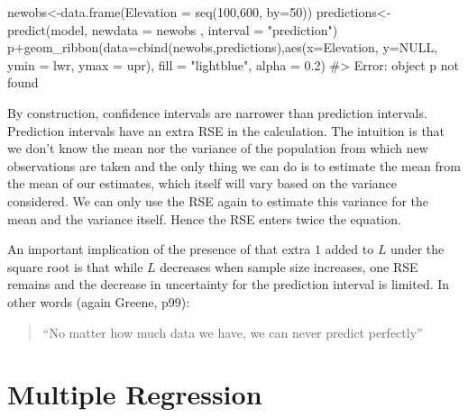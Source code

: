 \documentclass[
  letterpaper,
  DIV=11,
  numbers=noendperiod]{scrreprt}
\newenvironment{Shaded}{\begin{snugshade}}{\end{snugshade}}
\newcommand{\AttributeTok}[1]{\textcolor[rgb]{0.40,0.45,0.13}{#1}}
\newcommand{\CommentTok}[1]{\textcolor[rgb]{0.37,0.37,0.37}{#1}}
\newcommand{\ConstantTok}[1]{\textcolor[rgb]{0.56,0.35,0.01}{#1}}
\newcommand{\DecValTok}[1]{\textcolor[rgb]{0.68,0.00,0.00}{#1}}
\newcommand{\FloatTok}[1]{\textcolor[rgb]{0.68,0.00,0.00}{#1}}
\newcommand{\FunctionTok}[1]{\textcolor[rgb]{0.28,0.35,0.67}{#1}}
\newcommand{\NormalTok}[1]{\textcolor[rgb]{0.00,0.23,0.31}{#1}}
\newcommand{\OtherTok}[1]{\textcolor[rgb]{0.00,0.23,0.31}{#1}}
\newcommand{\SpecialCharTok}[1]{\textcolor[rgb]{0.37,0.37,0.37}{#1}}
\newcommand{\StringTok}[1]{\textcolor[rgb]{0.13,0.47,0.30}{#1}}
\begin{document}
\begin{Shaded}
\begin{Highlighting}[]
\NormalTok{newobs}\OtherTok{\textless{}{-}}\FunctionTok{data.frame}\NormalTok{(}\AttributeTok{Elevation =} \FunctionTok{seq}\NormalTok{(}\DecValTok{100}\NormalTok{,}\DecValTok{600}\NormalTok{, }\AttributeTok{by=}\DecValTok{50}\NormalTok{))}
\NormalTok{predictions}\OtherTok{\textless{}{-}}\FunctionTok{predict}\NormalTok{(model, }\AttributeTok{newdata =}\NormalTok{ newobs , }\AttributeTok{interval =} \StringTok{"prediction"}\NormalTok{)}
\NormalTok{p}\SpecialCharTok{+}\FunctionTok{geom\_ribbon}\NormalTok{(}\AttributeTok{data=}\FunctionTok{cbind}\NormalTok{(newobs,predictions),}\FunctionTok{aes}\NormalTok{(}\AttributeTok{x=}\NormalTok{Elevation, }\AttributeTok{y=}\ConstantTok{NULL}\NormalTok{, }\AttributeTok{ymin =}\NormalTok{ lwr, }\AttributeTok{ymax =}\NormalTok{ upr), }\AttributeTok{fill =} \StringTok{"lightblue"}\NormalTok{, }\AttributeTok{alpha =} \FloatTok{0.2}\NormalTok{)}
\CommentTok{\#\textgreater{} Error: object \textquotesingle{}p\textquotesingle{} not found}
\end{Highlighting}
\end{Shaded}

By construction, confidence intervals are narrower than prediction
intervals. Prediction intervals have an extra RSE in the calculation.
The intuition is that we don't know the mean nor the variance of the
population from which new observations are taken and the only thing we
can do is to estimate the mean from the mean of our estimates, which
itself will vary based on the variance considered. We can only use the
RSE again to estimate this variance for the mean and the variance
itself. Hence the RSE enters twice the equation.

An important implication of the presence of that extra \(1\) added to
\(L\) under the square root is that while \(L\) decreases when sample
size increases, one RSE remains and the decrease in uncertainty for the
prediction interval is limited. In other words (again Greene, p99):

\begin{quote}
``No matter how much data we have, we can never predict perfectly''
\end{quote}

\chapter{Multiple Regression}\label{multiple-regression}
\end{document}

